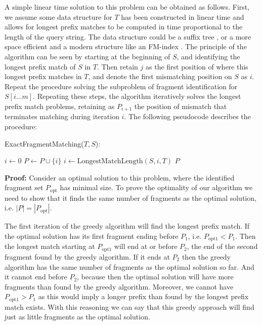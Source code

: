 A simple linear time solution to this problem can be obtained as
follows. First, we assume some data structure for $T$ has been
constructed in linear time and allows for longest prefix matches to be
computed in time proportional to the length of the query string. The
data structure could be a suffix tree \citep{mccreight1976space}, or a
more space efficient and a modern structure like an FM-index
\citep{ferragina2000opportunistic}. The principle of the algorithm can be
seen by starting at the beginning of $S$, and identifying the longest
prefix match of $S$ in $T$. Then retain $j$ as the first position of
where this longest prefix matches in $T$, and denote the first
mismatching position on $S$ as $i$. Repeat the procedure solving the
subproblem of fragment identification for $S[i\dots m]$. Repeating these
steps, the algorithm iteratively solves the longest prefix match
problems, retaining as $P_{i+1}$ the position of mismatch that
terminates matching during iteration $i$. The following pseudocode
describes the procedure:

\begin{algorithm}[H]
\caption{ExactFragmentMatching($T, S$):}
\begin{algorithmic}[1]
  \STATE $i \leftarrow 0$
    \STATE $P \leftarrow P\cup \{i\}$
    \STATE $i \leftarrow \text{LongestMatchLength}(S,i,T)$
  \ENDWHILE
  \RETURN $P$
\end{algorithmic}
\end{algorithm}

\textbf{Proof:} Consider an optimal solution to this problem, where the
identified fragment set $P_{\mathrm{opt}}$ has minimal size. To prove
the optimality of our algorithm we need to show that it finds the same
number of fragments as the optimal solution, i.e. $|P| =
|P_{\mathrm{opt}}|$.

The first iteration of the greedy algorithm will find the longest prefix
match. If the optimal solution has its first fragment ending before
$P_1$, i.e. $P_{\mathrm{opt1}} < P_1$. Then the longest match starting at
$P_{\mathrm{opt1}}$ will end at or before $P_2$, the end of the second
fragment found by the greedy algorithm. If it ends at $P_2$ then the
greedy algorithm has the same number of fragments as the optimal
solution so far. And it cannot end before $P_2$, because then the
optimal solution will have more fragments than found by the greedy
algorithm. Moreover, we cannot have $P_{\mathrm{opt1}} > P_1$ as this
would imply a longer prefix than found by the longest prefix match
exists. With this reasoning we can say that this greedy approach will
find just as little fragments as the optimal solution.

